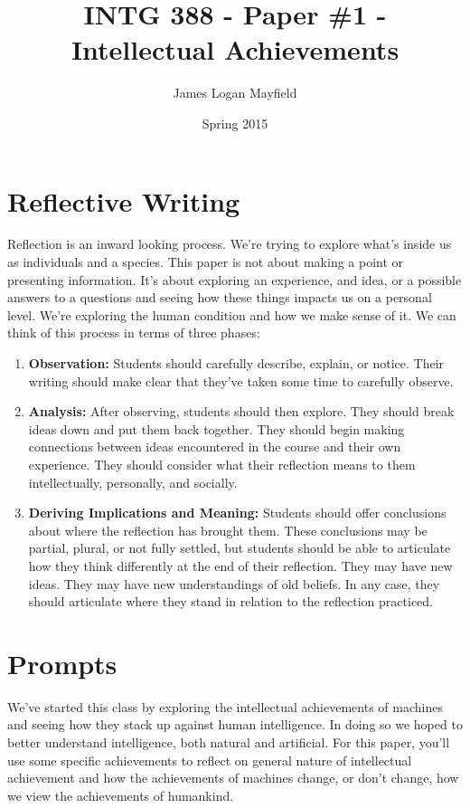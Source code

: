 \documentclass[]{tufte-handout}
\title{INTG 388 - Paper \#1 - Intellectual Achievements}
\author{James Logan Mayfield }
\date{ Spring 2015 }
\begin{document}
\maketitle

\section{Reflective Writing}

Reflection is an inward looking process. We're trying to explore what's inside us as individuals and a species. This paper is not about making a point or presenting information. It's about exploring an experience, and idea, or a possible answers to a questions and seeing how these things impacts us on a personal level. We're exploring the human condition and how we make sense of it. We can think of this process in terms of three phases:
\begin{enumerate}
\item \textbf{Observation:} Students should carefully describe, explain, or notice. Their writing should make clear that they've taken some time to carefully observe. \newline
\item \textbf{Analysis:} After observing, students should then explore. They should break ideas down and put them back together. They should begin making connections between ideas encountered in the course and their own experience. They should consider what their reflection means to them intellectually, personally, and socially. \newline
\item \textbf{Deriving Implications and Meaning:} Students should offer conclusions about where the reflection has brought them. These conclusions may be partial, plural, or not fully settled, but students should be able to articulate how they think differently at the end of their reflection. They may have new ideas. They may have new understandings of old beliefs. In any case, they should articulate where they stand in relation to the reflection practiced. 
\end{enumerate}


\section{Prompts}

We've started this class by exploring the intellectual achievements of machines and seeing how they stack up against human intelligence.  In doing so we hoped to better understand intelligence, both natural and artificial. For this paper, you'll use some specific achievements to reflect on general nature of intellectual achievement and how the achievements of machines change, or don't change, how we view the achievements of humankind. 
\end{document}
